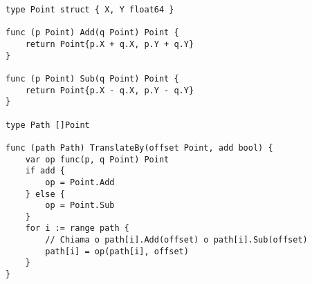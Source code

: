 \begin{lstlisting}[frame=single, label={lst:lstlisting5-4.5}]
type Point struct { X, Y float64 }

func (p Point) Add(q Point) Point {
    return Point{p.X + q.X, p.Y + q.Y}
}

func (p Point) Sub(q Point) Point {
    return Point{p.X - q.X, p.Y - q.Y}
}

type Path []Point

func (path Path) TranslateBy(offset Point, add bool) {
    var op func(p, q Point) Point
    if add {
        op = Point.Add
    } else {
        op = Point.Sub
    }
    for i := range path {
        // Chiama o path[i].Add(offset) o path[i].Sub(offset)
        path[i] = op(path[i], offset)
    }
}
\end{lstlisting}